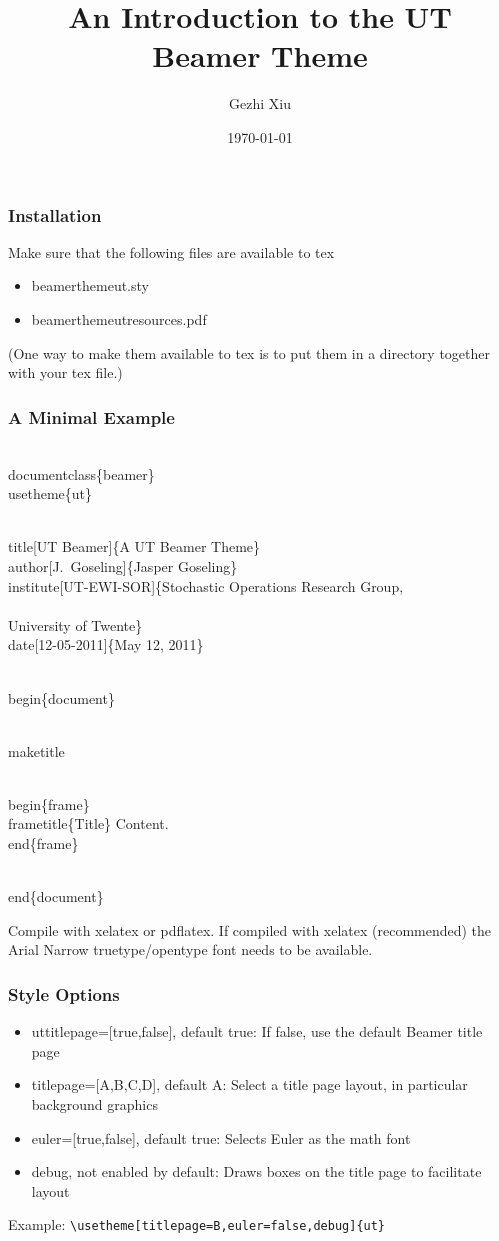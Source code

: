 \documentclass{beamer}
\title[UT Beamer]{An Introduction to the UT\\ Beamer Theme}
\author[G. Xiu]{Gezhi Xiu} %
\institute[IRSGIS PKU]{Complexity Research Group,\\Peking University}
\date[\today]{\today}
\begin{document}
\maketitle
\begin{frame} \frametitle{Installation}
Make sure that the following files are available to tex
\begin{itemize}
\item beamerthemeut.sty
\item beamerthemeutresources.pdf
\end{itemize}
(One way to make them available to tex is to put them in a directory together with your tex file.)
\end{frame}

\begin{frame}[fragile] \frametitle{A Minimal Example}
{\tiny
\begin{semiverbatim}
\\documentclass\{beamer\}
\\usetheme\{ut\}

\\title[UT Beamer]\{A UT Beamer Theme\}
\\author[J.~Goseling]\{Jasper Goseling\}
\\institute[UT-EWI-SOR]\{Stochastic Operations Research
  Group,\\\\ University of Twente\}
\\date[12-05-2011]\{May 12, 2011\}

\\begin\{document\}

\\maketitle

\\begin\{frame\}\\frametitle\{Title\}
Content.
\\end\{frame\}

\\end\{document\}
\end{semiverbatim}
}

Compile with xelatex or pdflatex. If compiled with xelatex (recommended) the Arial Narrow truetype/opentype font needs to be available.
\end{frame}

\begin{frame}[fragile] \frametitle{Style Options}
\begin{itemize}
\item uttitlepage=[true,false], default true: If false, use the default Beamer title page
\item titlepage=[A,B,C,D], default A: Select a title page layout, in particular background graphics
\item euler=[true,false], default true: Selects Euler as the math font
\item debug, not enabled by default: Draws boxes on the title page to facilitate layout
\end{itemize}

Example: \verb!\usetheme[titlepage=B,euler=false,debug]{ut}!
\end{frame}
\end{document}
